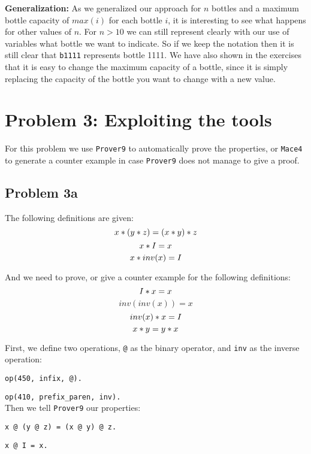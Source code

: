 \documentclass[a4paper]{article}
\begin{document}
	{\bf Generalization:} 
As we generalized our approach for $n$ bottles and a maximum bottle capacity of $max(i)$ for each bottle $i$, it is interesting to see what happens for other values of $n$. For $n > 10$ we can still represent clearly with our use of variables what bottle we want to indicate. So if we keep the notation then it is still clear that \texttt{b1111} represents bottle 1111. We have also shown in the exercises that it is easy to change the maximum capacity of a bottle, since it is simply replacing the capacity of the bottle you want to change with a new value.
	
	
	\section*{Problem 3: Exploiting the tools}
	For this problem we use {\tt Prover9} to automatically prove the properties, or {\tt Mace4} to generate a counter example in case {\tt Prover9} does not manage to give a proof.
	
	\subsection*{Problem 3a}
	The following definitions are given:
	$$ x \** (y \** z) = (x \** y) \** z$$
	$$x \** I = x$$
	$$x \** inv(x) = I$$
	
	And we need to prove, or give a counter example for the following definitions:
	$$I \** x = x$$
	$$inv(inv(x)) = x$$
	$$inv(x) \** x = I$$ 
	$$x \** y = y \** x$$
	
	First, we define two operations, {\tt @} as the binary operator, and {\tt inv} as the inverse operation:
	
	{\tt op(450, infix, @). }
	
	{\tt op(410, prefix\_paren, inv).}\\
	
	Then we tell {\tt Prover9} our properties: 
	
	{\tt x @ (y @ z) = (x @ y) @ z.}
	
	{\tt x @ I = x.}
	 
\end{document}
